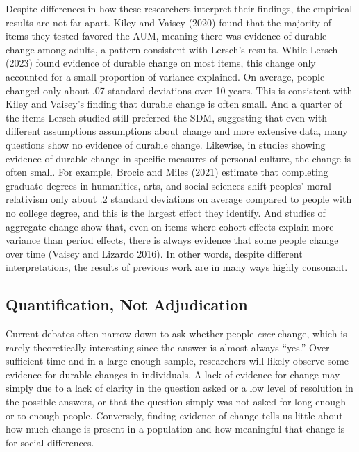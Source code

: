 \documentclass[
  12pt,
]{article}
\begin{document}
Despite differences in how these researchers interpret their findings,
the empirical results are not far apart. Kiley and Vaisey (2020) found
that the majority of items they tested favored the AUM, meaning there
was evidence of durable change among adults, a pattern consistent with
Lersch's results. While Lersch (2023) found evidence of durable change
on most items, this change only accounted for a small proportion of
variance explained. On average, people changed only about .07 standard
deviations over 10 years. This is consistent with Kiley and Vaisey's
finding that durable change is often small. And a quarter of the items
Lersch studied still preferred the SDM, suggesting that even with
different assumptions assumptions about change and more extensive data,
many questions show no evidence of durable change. Likewise, in studies
showing evidence of durable change in specific measures of personal
culture, the change is often small. For example, Brocic and Miles (2021)
estimate that completing graduate degrees in humanities, arts, and
social sciences shift peoples' moral relativism only about .2 standard
deviations on average compared to people with no college degree, and
this is the largest effect they identify. And studies of aggregate
change show that, even on items where cohort effects explain more
variance than period effects, there is always evidence that some people
change over time (Vaisey and Lizardo 2016). In other words, despite
different interpretations, the results of previous work are in many ways
highly consonant.

\hypertarget{quantification-not-adjudication}{%
\subsection{Quantification, Not
Adjudication}\label{quantification-not-adjudication}}

Current debates often narrow down to ask whether people \emph{ever}
change, which is rarely theoretically interesting since the answer is
almost always ``yes.'' Over sufficient time and in a large enough
sample, researchers will likely observe some evidence for durable
changes in individuals. A lack of evidence for change may simply due to
a lack of clarity in the question asked or a low level of resolution in
the possible answers, or that the question simply was not asked for long
enough or to enough people. Conversely, finding evidence of change tells
us little about how much change is present in a population and how
meaningful that change is for social differences.
\end{document}

